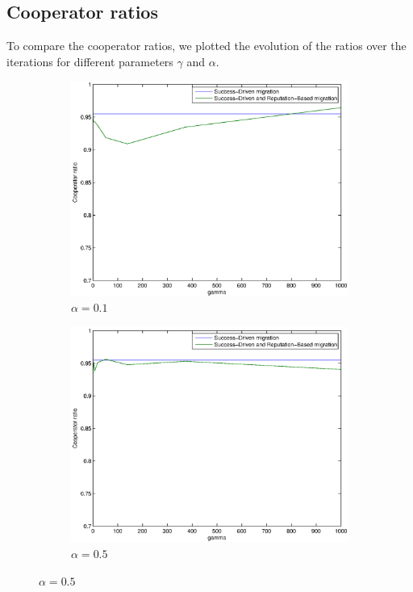 \documentclass[11pt]{article}
\begin{document}
\newpage
\subsection{Cooperator ratios}

To compare the cooperator ratios, we plotted the evolution of the ratios over the iterations for different parameters $\gamma$ and $\alpha$.

\begin{figure}
	\centering
	\begin{subfigure}[t]{0.48\textwidth}
        \includegraphics[width=\textwidth]{../../other/plots/alpha01.eps}
	\caption{$\alpha = 0.1$}
	\label{fig:cooperator_ratios_5000-1}
    	\end{subfigure}
	\begin{subfigure}[t]{0.48\textwidth}
        \includegraphics[width=\textwidth]{../../other/plots/alpha05.eps}
	\caption{$\alpha = 0.5$}
	\label{fig:cooperator_ratios_5000-2}
    	\end{subfigure}


\end{figure}
\end{document}
